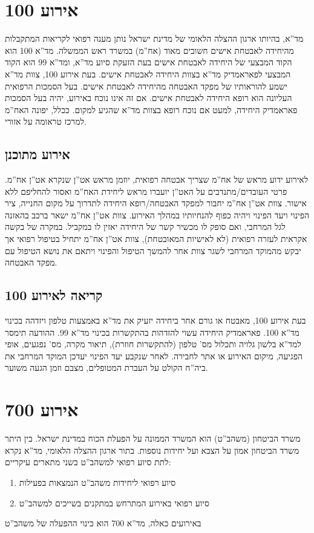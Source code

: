 \documentclass{article}
\begin{document}
\section{אירוע 100}
מד''א, בהיותו ארגון ההצלה הלאומי של מדינת ישראל נותן מענה רפואי לקריאות המתקבלות מהיחידה לאבטחת אישים חשובים מאוד (אח''מ) במשרד ראש הממשלה. מד''א 100 הוא הקוד המבצעי של היחידה לאבטחת אישים בעת הזעקת סיוע מד''א, ומד''א 99 הוא הקוד המבצעי לפאראמדיק מד''א בצוות היחידה לאבטחת אישים. בעת אירוע 100, צוות מד''א ישמע להוראותיו של מפקד האבטחה מהיחידה לאבטחת אישים. בעל הסמכות הרפואית העליונה הוא רופא היחידה לאבטחת אישים. אם זה אינו נוכח באירוע, יהיה בעל הסמכות פאראמדיק היחידה, למעט אם נוכח רופא בצוות מד''א
שהגיע למקום. ככלל, יפונה האח''מ למרכז טראומה על אזורי.

\subsection{אירוע מתוכנן}
לאירוע ידוע מראש של אח''מ שצריך אבטחה רפואית, יוזמן מראש אט''ן שנקרא אט''ן אח''מ. פרטי העובדים/מתנדבים על האט''ן יועברו מראש ליחידת האח''מ ואסור להחליפם ללא אישור. צוות אט''ן אח''מ יחבור למפקד האבטחה/רופא היחידה לתדרוך על מקום החנייה, ציר הפינוי ויעד הפינוי ויהיה כפוף להנחיותיו במהלך האירוע. צוות אט''ן אח''מ ישאר ברכב בהאזנה לגל המרחבי, ואם סופק לו מכשיר קשר של היחידה יאזין לו במקביל. במקרה של בקשה אקראית לעזרה רפואית (לא לאישיות המאובטחת), צוות אט''ן אח''מ יתחיל בטיפול רפואי אך יבקש
מהמוקד המרחבי לשגר צוות אחר להמשך הטיפול והפינוי ויתאם את נושא הטיפול עם מפקד האבטחה.

\subsection{קריאה לאירוע 100}
בעת אירוע 100, מאבטח או גורם אחר ביחידה יזעיק את מד''א באמצעות טלפון ויזדהה בכינוי מד''א 100. פאראמדיק היחידה עשוי להזדהות בהתקשרות בכינוי מד''א 99. ההודעה תימסר למד''א בלשון גלויה ותכלול מס' טלפון (להתקשרות חוזרת), תיאור מקרה, מס' נפגעים, אופי הפגיעה, מיקום האירוע או אתר לחבירה. לאחר שנקבע יעד הפינוי יעדכן המוקד המרחבי את ביה''ח הקולט על העברת המטופלים, מצבם וזמן הגעה משוער.

\section{אירוע 700}
משרד הביטחון (משהב''ט) הוא המשרד הממונה על הפעלת הכוח במדינת ישראל. בין היתר משרד הביטחון אמון על הצבא ועל יחידות נוספות. בתור ארגון ההצלה הלאומי, מד''א נקרא לתת סיוע רפואי למשהב''ט בשני מתארים עיקריים:
\begin{enumerate}
    \item סיוע רפואי ליחידות משהב''ט הנמצאות בפעילות
    \item סיוע רפואי באירוע המתרחש במתקנים בשייכים למשהב''ט
\end{enumerate}
באירועים כאלה, מד''א 700 הוא כינוי ההפעלה של משהב''ט
\end{document}
